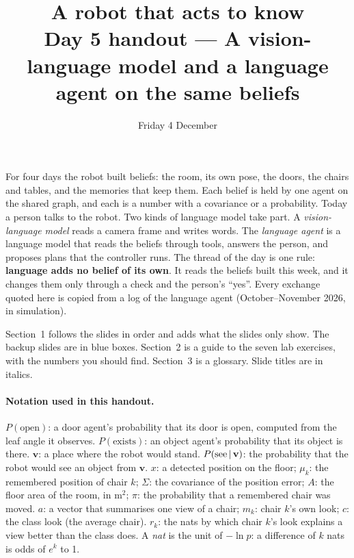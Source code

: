 \documentclass[11pt]{article}
\title{\textbf{A robot that acts to know}\\[0.3em]\large Day 5 handout --- A vision-language model and a language agent on the same beliefs}
\author{}
\date{Friday 4 December}
\begin{document}
\maketitle
\vspace{-2em}

\noindent
For four days the robot built beliefs: the room, its own pose, the doors, the chairs and tables, and the memories that keep them. Each belief is held by one agent on the shared graph, and each is a number with a covariance or a probability. Today a person talks to the robot. Two kinds of language model take part. A \emph{vision-language model} reads a camera frame and writes words. The \emph{language agent} is a language model that reads the beliefs through tools, answers the person, and proposes plans that the controller runs. The thread of the day is one rule: \textbf{language adds no belief of its own}. It reads the beliefs built this week, and it changes them only through a check and the person's ``yes''. Every exchange quoted here is copied from a log of the language agent (October--November 2026, in simulation).

Section~1 follows the slides in order and adds what the slides only show. The backup slides are in blue boxes. Section~2 is a guide to the seven lab exercises, with the numbers you should find. Section~3 is a glossary. Slide titles are in italics.

\paragraph{Notation used in this handout.} $P(\text{open})$: a door agent's probability that its door is open, computed from the leaf angle it observes. $P(\text{exists})$: an object agent's probability that its object is there. $\mathbf v$: a place where the robot would stand. $P(\text{see}\,|\,\mathbf v)$: the probability that the robot would see an object from $\mathbf v$. $x$: a detected position on the floor; $\mu_k$: the remembered position of chair $k$; $\Sigma$: the covariance of the position error; $A$: the floor area of the room, in m$^2$; $\pi$: the probability that a remembered chair was moved. $a$: a vector that summarises one view of a chair; $m_k$: chair $k$'s own look; $c$: the class look (the average chair). $r_k$: the nats by which chair $k$'s look explains a view better than the class does. A \emph{nat} is the unit of $-\ln p$: a difference of $k$ nats is odds of $e^k$ to 1.

\end{document}
